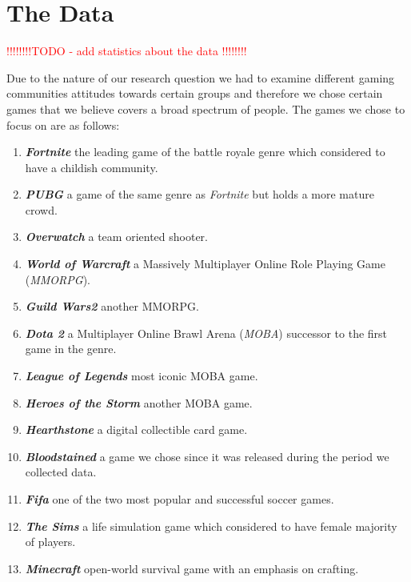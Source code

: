 \section{The Data}

\textcolor{red}{!!!!!!!!TODO - add statistics about the data !!!!!!!!}

Due to the nature of our research question we had to examine different gaming communities attitudes towards certain groups and therefore we chose certain games that we believe covers a broad spectrum of people.
The games we chose to focus on are as follows: 
\begin{enumerate}[noitemsep]
    \item \textbf{\emph{Fortnite}} the leading game of the battle royale genre which considered to have a childish community.
    
    \item  \textbf{\emph{PUBG}} a game of the same genre as \emph{Fortnite} but holds a more mature crowd.
    
    \item  \textbf{\emph{Overwatch}} a team oriented shooter.
    
    \item  \textbf{\emph{World of Warcraft}} a Massively Multiplayer Online Role Playing Game (\emph{MMORPG}).
    
    \item  \textbf{\emph{Guild Wars2}} another MMORPG.
    
    \item  \textbf{\emph{Dota 2}} a Multiplayer Online Brawl Arena (\emph{MOBA}) successor to the first game in the genre.
    
    \item \textbf{\emph{League of Legends}} most iconic MOBA game.
    
    \item \textbf{\emph{Heroes of the Storm}} another MOBA game.
    
    \item \textbf{\emph{Hearthstone}} a digital collectible card game.
    
    \item \textbf{\emph{Bloodstained}} a game we chose since it was released during the period we collected data.
    
    \item \textbf{\emph{Fifa}} one of the two most popular and successful soccer games.
    
    \item \textbf{\emph{The Sims}} a life simulation game which considered to have female majority of players.
    
    \item \textbf{\emph{Minecraft}} open-world survival game with an emphasis on crafting.
\end{enumerate} 


